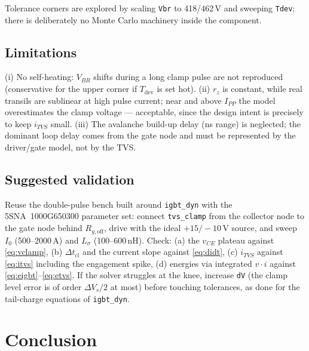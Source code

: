 \documentclass[11pt,a4paper]{article}
\begin{document}
Tolerance corners are explored by scaling \texttt{Vbr} to
418/462\,V and sweeping \texttt{Tdev}; there is deliberately no Monte
Carlo machinery inside the component.

\subsection{Limitations}

(i) No self-heating: $V_{BR}$ shifts during a long clamp pulse are not
reproduced (conservative for the upper corner if $T_{\mathrm{dev}}$ is
set hot). (ii) $r_z$ is constant, while real transils are sublinear at
high pulse current; near and above $I_{PP}$ the model overestimates the
clamp voltage --- acceptable, since the design intent is precisely to
keep $i_{TVS}$ small. (iii) The avalanche build-up delay (ns range) is
neglected; the dominant loop delay comes from the gate node and must be
represented by the driver/gate model, not by the TVS.

\subsection{Suggested validation}

Reuse the double-pulse bench built around \texttt{igbt\_dyn} with the
5SNA~1000G650300 parameter set: connect \texttt{tvs\_clamp} from the
collector node to the gate node behind $R_{g,\mathrm{off}}$, drive with
the ideal $+15/-10$\,V source, and sweep $I_0$ (500--2000\,A) and
$L_\sigma$ (100--600\,nH). Check: (a) the $v_{CE}$ plateau against
\eqref{eq:vclamp}, (b) $\Delta t_{\mathrm{cl}}$ and the current slope
against \eqref{eq:didt}, (c) $i_{TVS}$ against \eqref{eq:itvs}
including the engagement spike, (d) energies via integrated
$v\!\cdot\!i$ against \eqref{eq:eigbt}--\eqref{eq:etvs}. If the solver
struggles at the knee, increase \texttt{dV} (the clamp level error is
of order $\Delta V_s/2$ at most) before touching tolerances, as done
for the tail-charge equations of \texttt{igbt\_dyn}.

\section{Conclusion}
\end{document}
